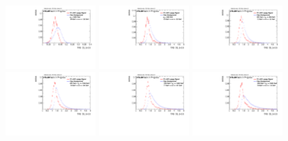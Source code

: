\begin{figure}[H]
\includegraphics[width=0.3\textwidth]{sascha_input/Appendix/Distributions/w/distributions/beta05/h_assisted_tj_C2_05_bin6.pdf} 
\bigskip
\includegraphics[width=0.3\textwidth]{sascha_input/Appendix/Distributions/w/distributions/beta05/h_assisted_tj_D2_05_bin1.pdf} \hspace{1mm}
\includegraphics[width=0.3\textwidth]{sascha_input/Appendix/Distributions/w/distributions/beta05/h_assisted_tj_D2_05_bin2.pdf} \hspace{1mm}
\includegraphics[width=0.3\textwidth]{sascha_input/Appendix/Distributions/w/distributions/beta05/h_assisted_tj_D2_05_bin3.pdf} 
\bigskip
\includegraphics[width=0.3\textwidth]{sascha_input/Appendix/Distributions/w/distributions/beta05/h_assisted_tj_D2_05_bin4.pdf} \hspace{1mm}
\includegraphics[width=0.3\textwidth]{sascha_input/Appendix/Distributions/w/distributions/beta05/h_assisted_tj_D2_05_bin5.pdf} \hspace{1mm}

\end{figure}

